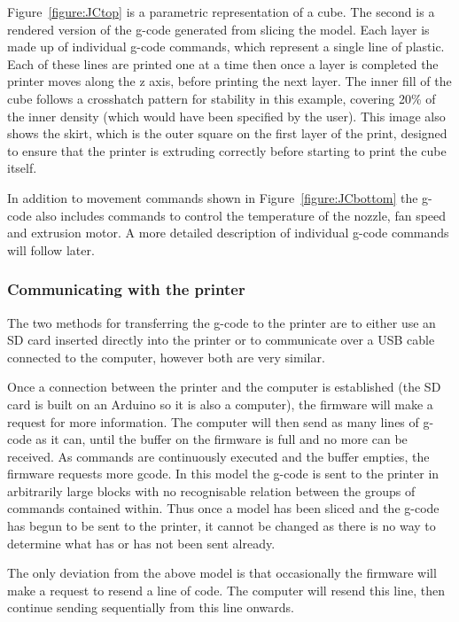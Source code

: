 \documentclass[11pt]{report} %
\begin{document}
Figure~\ref{figure:JCtop} is a parametric representation of a cube. The second is a rendered version of the g-code generated from slicing the model. Each layer is made up of individual g-code commands, which represent a single line of plastic. Each of these lines are printed one at a time then once a layer is completed the printer moves along the z axis, before printing the next layer. The inner fill of the cube follows a crosshatch pattern for stability in this example, covering 20\% of the inner density (which would have been specified by the user). This image also shows the skirt, which is the outer square on the first layer of the print, designed to ensure that the printer is extruding correctly before starting to print the cube itself.

In addition to movement commands shown in Figure~\ref{figure:JCbottom} the g-code also includes commands to control the temperature of the nozzle, fan speed and extrusion motor. A more detailed description of individual g-code commands will follow later.

\subsubsection{Communicating with the printer}
The two methods for transferring the g-code to the printer are to either use an SD card inserted directly into the printer or to communicate over a USB cable connected to the computer, however both are very similar.

Once a connection between the printer and the computer is established (the SD card is built on an Arduino so it is also a computer), the firmware will make a request for more information. The computer will then send as many lines of g-code as it can, until the buffer on the firmware is full and no more can be received. As commands are continuously executed and the buffer empties, the firmware requests more gcode. In this model the g-code is sent to the printer in arbitrarily large blocks with no recognisable relation between the groups of commands contained within. Thus once a model has been sliced and the g-code has begun to be sent to the printer, it cannot be changed as there is no way to determine what has or has not been sent already.

The only deviation from the above model is that occasionally the firmware will make a request to resend a line of code. The computer will resend this line, then continue sending sequentially from this line onwards. 
\end{document}
